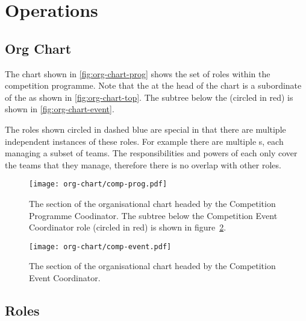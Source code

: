 \section{Operations}
\label{sec:comp-prog-ops}

\subsection{Org Chart}

The chart shown in \autoref{fig:org-chart-prog} shows the set of roles within the competition programme. Note that the  at the head of the chart is a subordinate of the  as shown in \autoref{fig:org-chart-top}. The subtree below the  (circled in red) is shown in \autoref{fig:org-chart-event}.

The roles shown circled in dashed blue are special in that there are multiple independent instances of these roles. For example there are multiple s, each managing a subset of teams. The responsibilities and powers of each  only cover the teams that they manage, therefore there is no overlap with other roles.

\begin{landscape}
  \begin{figure}
    \begin{center}
      \texttt{[image: org-chart/comp-prog.pdf]}
    \end{center}
    \caption{\label{fig:org-chart-prog}The section of the organisational chart headed by the Competition Programme Coodinator.  The subtree below the Competition Event Coordinator role (circled in red) is shown in figure~\ref{fig:org-chart-event}.}
  \end{figure}
\end{landscape}

\begin{landscape}
  \begin{figure}
    \begin{center}
      \texttt{[image: org-chart/comp-event.pdf]}
    \end{center}
    \caption{\label{fig:org-chart-event}The section of the organisational chart headed by the Competition Event Coordinator.}
  \end{figure}
\end{landscape}

\subsection{Roles}

